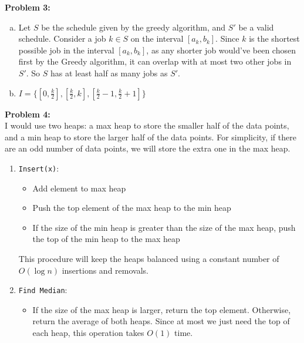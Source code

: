 \documentclass{article}
\begin{document}
\textbf{Problem 3:}
\begin{enumerate}[a)]
    \item Let $S$ be the schedule given by the greedy algorithm, and $S'$ be a valid schedule. Consider a job $k \in S$ on the interval $[a_k, b_k]$. Since $k$ is the shortest possible job in the interval $[a_k, b_k]$, as any shorter job would've been chosen first by the Greedy algorithm, it can overlap with at most two other jobs in $S'$. So $S$ has at least half as many jobs as $S'$.
    \item $I = \{[0, \frac{k}{2}], [\frac{k}{2}, k], [\frac{k}{2} - 1, \frac{k}{2} + 1]\}$
\end{enumerate} 

\textbf{Problem 4:} \\[1.0ex]
I would use two heaps: a max heap to store the smaller half of the data points, and a min heap to store the larger half of the data points. For simplicity, if there are an odd number of data points, we will store the extra one in the max heap.
\begin{enumerate}
    \item \texttt{Insert(x)}: 
    \begin{itemize}
        \item Add element to max heap
        \item Push the top element of the max heap to the min heap
        \item If the size of the min heap is greater than the size of the max heap, push the top of the min heap to the max heap
    \end{itemize}
    This procedure will keep the heaps balanced using a constant number of $O( \log n)$ insertions and removals.
    \item \texttt{Find Median}: 
    \begin{itemize}
        \item If the size of the max heap is larger, return the top element. Otherwise, return the average of both heaps. Since at most we just need the top of each heap, this operation takes $O(1)$ time.
    \end{itemize}
\end{enumerate}
\end{document}
